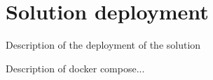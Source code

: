 \section{Solution deployment}
Description of the deployment of the solution

Description of docker compose...